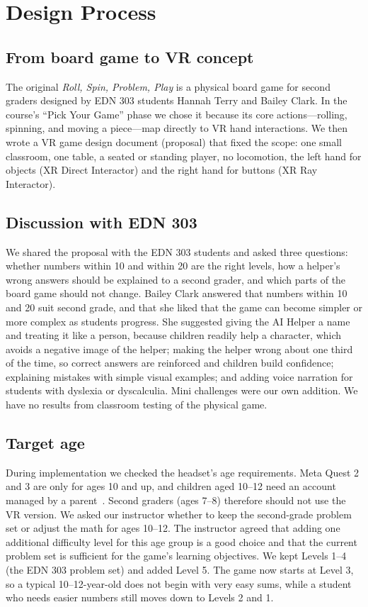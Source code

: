 \documentclass[conference]{IEEEtran}
\begin{document}
\section{Design Process}

\subsection{From board game to VR concept}
The original \emph{Roll, Spin, Problem, Play} is a physical board game for second graders designed by EDN 303 students Hannah Terry and Bailey Clark. In the course's ``Pick Your Game'' phase we chose it because its core actions---rolling, spinning, and moving a piece---map directly to VR hand interactions. We then wrote a VR game design document (proposal) that fixed the scope: one small classroom, one table, a seated or standing player, no locomotion, the left hand for objects (XR Direct Interactor) and the right hand for buttons (XR Ray Interactor).

\subsection{Discussion with EDN 303}
We shared the proposal with the EDN 303 students and asked three questions: whether numbers within 10 and within 20 are the right levels, how a helper's wrong answers should be explained to a second grader, and which parts of the board game should not change. Bailey Clark answered that numbers within 10 and 20 suit second grade, and that she liked that the game can become simpler or more complex as students progress. She suggested giving the AI Helper a name and treating it like a person, because children readily help a character, which avoids a negative image of the helper; making the helper wrong about one third of the time, so correct answers are reinforced and children build confidence; explaining mistakes with simple visual examples; and adding voice narration for students with dyslexia or dyscalculia. Mini challenges were our own addition. We have no results from classroom testing of the physical game.

\subsection{Target age}
During implementation we checked the headset's age requirements. Meta Quest 2 and 3 are only for ages 10 and up, and children aged 10--12 need an account managed by a parent~\cite{metaparent}. Second graders (ages 7--8) therefore should not use the VR version. We asked our instructor whether to keep the second-grade problem set or adjust the math for ages 10--12. The instructor agreed that adding one additional difficulty level for this age group is a good choice and that the current problem set is sufficient for the game's learning objectives. We kept Levels 1--4 (the EDN 303 problem set) and added Level 5. The game now starts at Level 3, so a typical 10--12-year-old does not begin with very easy sums, while a student who needs easier numbers still moves down to Levels 2 and 1.
\end{document}
